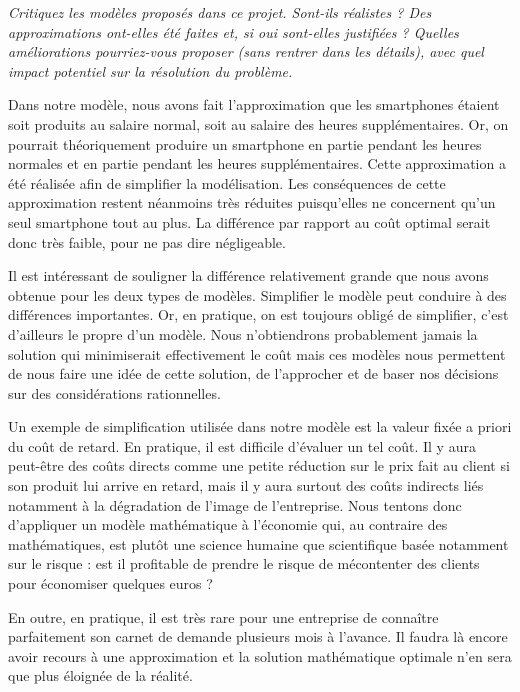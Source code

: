 \question %
\emph{Critiquez les modèles proposés dans ce projet. Sont-ils réalistes ?
Des approximations ont-elles été faites et, si oui sont-elles justifiées ?
Quelles améliorations pourriez-vous proposer (sans rentrer dans les détails),
avec quel impact potentiel sur la résolution du problème.}


Dans notre modèle, nous avons fait l'approximation que les smartphones étaient soit produits au salaire normal, soit au salaire des heures supplémentaires. Or, on pourrait théoriquement produire un smartphone en partie pendant les heures normales et en partie pendant les heures supplémentaires. Cette approximation a été réalisée afin de simplifier la modélisation. Les conséquences de cette approximation restent néanmoins très réduites puisqu'elles ne concernent qu'un seul smartphone tout au plus. La différence par rapport au coût optimal serait donc très faible, pour ne pas dire négligeable.

Il est intéressant de souligner la différence relativement grande que nous avons obtenue pour les deux types de modèles. Simplifier le modèle peut conduire à des différences importantes. Or, en pratique, on est toujours obligé de simplifier, c'est d'ailleurs le propre d'un modèle. Nous n'obtiendrons probablement jamais la solution qui minimiserait effectivement le coût mais ces modèles nous permettent de nous faire une idée de cette solution, de l'approcher et de baser nos décisions sur des considérations rationnelles. 

Un exemple de simplification utilisée dans notre modèle est la valeur fixée a priori du coût de retard. En pratique, il est difficile d'évaluer un tel coût. Il y aura peut-être des coûts directs comme une petite réduction sur le prix fait au client si son produit lui arrive en retard, mais il y aura surtout des coûts indirects liés notamment à la dégradation de l'image de l'entreprise. Nous tentons donc d'appliquer un modèle mathématique à l'économie qui, au contraire des mathématiques, est plutôt une science humaine que scientifique basée notamment sur le risque : est il profitable de prendre le risque de mécontenter des clients pour économiser quelques euros ?

En outre, en pratique, il est très rare pour une entreprise de connaître parfaitement son carnet de demande plusieurs mois à l'avance. Il faudra là encore avoir recours à une approximation et la solution mathématique optimale n'en sera que plus éloignée de la réalité.

